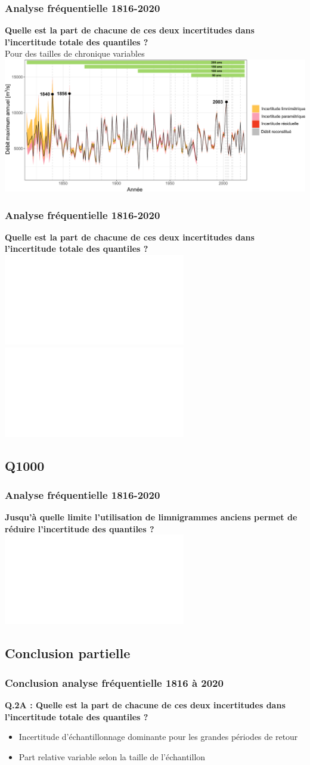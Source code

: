 \documentclass[compress,9pt]{beamer}
\begin{document}
	\begin{frame}[t]
		\frametitle{Analyse fréquentielle 1816-2020}
		\vfill
		\centering
		\textbf{Quelle est la part de chacune de ces deux incertitudes dans l'incertitude totale des quantiles ? }\\
		Pour des tailles de chronique variables\\
		\vfill
		\centering
		\includegraphics[width = .9\textwidth]{./Figures/IC_AMAX_Both_Bands.pdf} 
		\vfill
	\end{frame}
	
	\begin{frame}[t]
		\frametitle{Analyse fréquentielle 1816-2020}
		\vfill
		\centering
		\textbf{Quelle est la part de chacune de ces deux incertitudes dans l'incertitude totale des quantiles ? }\\
		\vfill
		\centering
		\includegraphics<1>[width = .8\textwidth]{./Figures/Ukplot4cases1.pdf}	
		\includegraphics<2>[width = .8\textwidth]{./Figures/Ukplot4cases2.pdf}	
		\vfill
	\end{frame}
	
	\subsection{Q1000}
	\begin{frame}[c]
		\frametitle{Analyse fréquentielle 1816-2020}
		\vfill
		\centering
		\textbf{Jusqu'à quelle limite l'utilisation de limnigrammes anciens permet de réduire l'incertitude des quantiles ?}
		\vfill
		\centering
		\includegraphics<1>[width = .78\textwidth]{./Figures/10e-Q1000SSize.pdf}
	\end{frame}
	
	\subsection{Conclusion partielle} 
	\begin{frame}[t]
		\frametitle{Conclusion analyse fréquentielle 1816 à 2020}
		\vfill
		\centering
		\large{\textbf{Q.2A : Quelle est la part de chacune de ces deux incertitudes dans l'incertitude totale des quantiles ?}}
		\vspace{10pt}
		\begin{itemize}
		\normalsize
			\item<2->[$\vartriangleright$] Incertitude d'échantillonnage dominante pour les grandes périodes de retour
			\vspace{5pt}
			\item<3->[$\vartriangleright$] Part relative variable selon la taille de l'échantillon
		\end{itemize}
		\vfill
	\end{frame}
	
\end{document}
